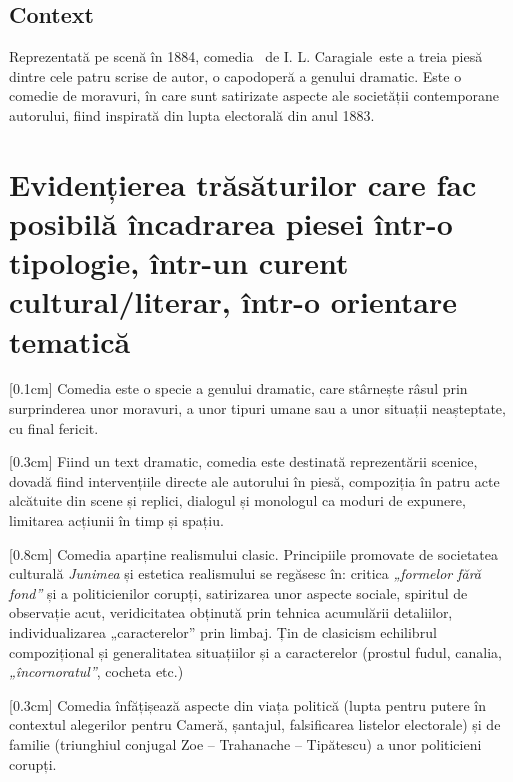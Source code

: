 \renewcommand{\operatitle}{\textbfit{„O scrisoare pierdută”}} %
\renewcommand{\operaauthor}{I. L. Caragiale} %


\subsection{Context}

Reprezentată pe scenă în 1884, comedia \operatitle\ de \operaauthor\ este a treia piesă dintre cele patru scrise de autor, o capodoperă a genului dramatic. Este o comedie de moravuri, în care sunt satirizate aspecte ale societății contemporane autorului, fiind inspirată din lupta electorală din anul 1883.


\section{Evidențierea trăsăturilor care fac posibilă încadrarea piesei într-o tipologie, într-un curent cultural/literar, într-o orientare tematică}

[0.1cm]
Comedia este o specie a genului dramatic, care stârnește râsul prin surprinderea unor moravuri, a unor tipuri umane sau a unor situații neașteptate, cu final fericit.

[0.3cm]
Fiind un text dramatic, comedia este destinată reprezentării scenice, dovadă fiind intervențiile directe ale autorului în piesă, compoziția în patru acte alcătuite din scene și replici, dialogul și monologul ca moduri de expunere, limitarea acțiunii în timp și spațiu.

[0.8cm]
Comedia aparține realismului clasic. Principiile promovate de societatea culturală \textit{Junimea} și estetica realismului se regăsesc în: critica \textit{„formelor fără fond”} și a politicienilor corupți, satirizarea unor aspecte sociale, spiritul de observație acut, veridicitatea obținută prin tehnica acumulării detaliilor, individualizarea „caracterelor” prin limbaj. Țin de clasicism echilibrul compozițional și generalitatea situațiilor și a caracterelor (prostul fudul, canalia, \textit{„încornoratul”}, cocheta etc.)

[0.3cm]
Comedia înfățișează aspecte din viața politică (lupta pentru putere în contextul alegerilor pentru Cameră, șantajul, falsificarea listelor electorale) și de familie (triunghiul conjugal Zoe -- Trahanache -- Tipătescu) a unor politicieni corupți.


